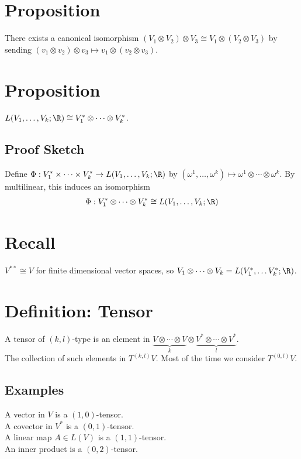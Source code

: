 \documentclass[11pt]{article}
\begin{document}
\section*{Proposition}
\label{sec:org3b979ac}
There exists a canonical isomorphism \((V_{1}\otimes V_{2})\otimes V_{3}\cong V_{1}\otimes(V_{2}\otimes V_{3})\) by sending \((v_{1}\otimes v_{2})\otimes v_{3}\mapsto v_{1}\otimes(v_{2}\otimes v_{3})\).\\
\section*{Proposition}
\label{sec:orga086051}
\(L(V_{1},\ldots,V_{k};\R)\cong V_{1}^{*}\otimes\cdots\otimes V_{k}^{*}\).\\
\subsection*{Proof Sketch}
\label{sec:org1ea8dab}
Define \(\Phi:V_{1}^{*}\times\cdots\times V_{k}^{*}\to L(V_{1},\ldots, V_{k};\R)\) by \((\omega^{1},\ldots,\omega^{k})\mapsto\omega^{1}\otimes\cdots\otimes\omega^{k}\). By multilinear, this induces an isomorphism\\
\begin{align*}
  \Phi:V_{1}^{*}\otimes\cdots\otimes V_{k}^{*}\cong L(V_{1},\ldots,V_{k};\R)
\end{align*}
\section*{Recall}
\label{sec:org1461e54}
\(V^{**}\cong V\) for finite dimensional vector spaces, so \(V_{1}\otimes\cdots\otimes V_{k}=L(V_{1}^{*},\ldots V_{k}^{*};\R)\).\\
\section*{Definition: Tensor}
\label{sec:org93cd845}
A tensor of \((k,l)\)-type is an element in \(\underbrace{V\otimes\cdots\otimes V}_{k}\otimes\underbrace{V^{*}\otimes\cdots\otimes V^{*}}_{l}\).\\
The collection of such elements in \(T^{(k,l)}V\). Most of the time we consider \(T^{(0,l)}V\).\\
\subsection*{Examples}
\label{sec:org6a303f3}
A vector in \(V\) is a \((1,0)\)-tensor.\\
A covector in \(V^{*}\) is a \((0,1)\)-tensor.\\
A linear map \(A\in L(V)\) is a \((1,1)\)-tensor.\\
An inner product is a \((0,2)\)-tensor.\\
\end{document}
